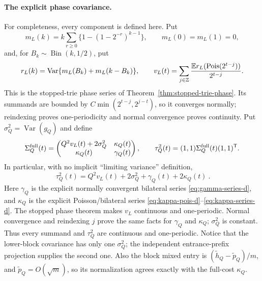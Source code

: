 \documentclass[11pt]{article}
\numberwithin{equation}{section}
\newcommand{\E}{\mathbb E}\newcommand{\Pp}{\mathbb P}
\newcommand{\Var}{\operatorname{Var}}\newcommand{\Cov}{\operatorname{Cov}}
\newcommand{\1}{\mathbf 1}\newcommand{\F}{\mathcal F}\newcommand{\D}{\mathcal D}
\begin{document}
\paragraph{The explicit phase covariance.}
For completeness, every component is defined here.  Put
\[
 m_L(k)=k\sum_{r\ge0}\{1-(1-2^{-r})^{k-1}\},\qquad m_L(0)=m_L(1)=0,
\]
and, for $B_k\sim\operatorname{Bin}(k,1/2)$, put
\[
 r_L(k)=\Var\{m_L(B_k)+m_L(k-B_k)\},\qquad
 v_L(t)=\sum_{j\in\mathbb Z}
 {\E r_L(\operatorname {Pois}(2^{t-j}))\over2^{t-j}}.
\]
This is the stopped-trie phase series of Theorem~\ref{thm:stopped-trie-phase}.  Its summands are bounded
by $C\min(2^{t-j},2^{j-t})$, so it converges normally; reindexing proves
one-periodicity and normal convergence proves continuity.
Put $\sigma_Q^2=\Var(g_Q)$ and define
\begin{equation}
 \Sigma_Q^{\rm full}(t)=
 \begin{pmatrix}
 Q^2v_L(t)+2\sigma_Q^2&\kappa_Q(t)\\
 \kappa_Q(t)&\gamma_Q(t)
 \end{pmatrix},\qquad
 \tau_Q^2(t)=(1,1)\Sigma_Q^{\rm full}(t)(1,1)^{\mathsf T}.
 \label{eq:final-sigma-tau-d}
\end{equation}
In particular, with no implicit ``limiting variance'' definition,
\begin{equation}
 \boxed{\ \tau_Q^2(t)=Q^2v_L(t)+2\sigma_Q^2+
              \gamma_Q(t)+2\kappa_Q(t)\ }.              \label{eq:final-tau-explicit-d}
\end{equation}
Here $\gamma_Q$ is the explicit normally convergent bilateral series
\eqref{eq:gamma-series-d}, and $\kappa_Q$ is the explicit Poisson/bilateral
series \eqref{eq:kappa-pois-d}--\eqref{eq:kappa-series-d}.  The stopped
phase theorem makes $v_L$ continuous and one-periodic.  Normal convergence
and reindexing $j$ prove the same facts for $\gamma_Q$ and $\kappa_Q$;
$\sigma_Q^2$ is constant.  Thus every summand and $\tau_Q^2$ are continuous
and one-periodic.  Notice that the lower-block covariance has only one
$\sigma_Q^2$; the independent entrance-prefix projection supplies the
second one.  Also the block mixed entry is
$(\widetilde h_Q-\widetilde p_Q)/m$, and
$\widetilde p_Q=O(\sqrt m)$, so its normalization agrees exactly with the
full-cost $\kappa_Q$.
\end{document}
